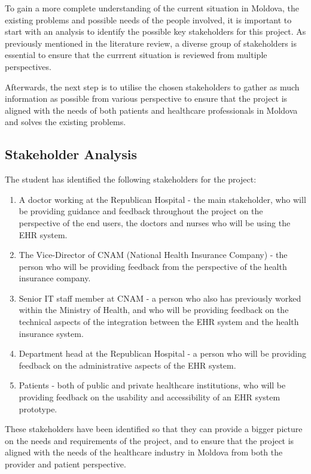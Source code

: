 To gain a more complete understanding of the current situation in Moldova, the existing problems and possible needs of the people involved, it is important to start with an analysis to identify the possible key stakeholders for this project. As previously mentioned in the literature review, a diverse group of stakeholders is essential to ensure that the currrent situation is reviewed from multiple perspectives. 

Afterwards, the next step is to utilise the chosen stakeholders to gather as much information as possible from various perspective to ensure that the project is aligned with the needs of both patients and healthcare professionals in Moldova and solves the existing problems.

\subsection{Stakeholder Analysis}

The student has identified the following stakeholders for the project:

\begin{enumerate}
    \item A doctor working at the Republican Hospital - the main stakeholder, who will be providing guidance and feedback throughout the project on the perspective of the end users, the doctors and nurses who will be using the EHR system.
    \item The Vice-Director of CNAM (National Health Insurance Company) - the person who will be providing feedback from the perspective of the health insurance company.
    \item Senior IT staff member at CNAM - a person who also has previously worked within the Ministry of Health, and who will be providing feedback on the technical aspects of the integration between the EHR system and the health insurance system.
    \item Department head at the Republican Hospital - a person who will be providing feedback on the administrative aspects of the EHR system.
    \item Patients - both of public and private healthcare institutions, who will be providing feedback on the usability and accessibility of an EHR system prototype.
\end{enumerate}

These stakeholders have been identified so that they can provide a bigger picture on the needs and requirements of the project, and to ensure that the project is aligned with the needs of the healthcare industry in Moldova from both the provider and patient perspective. 

